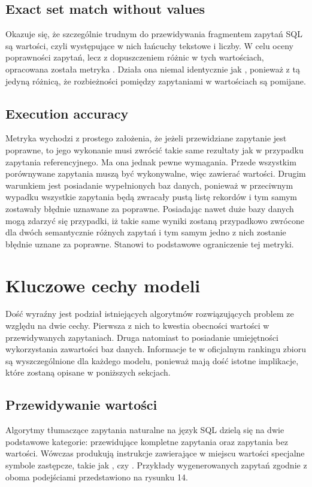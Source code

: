 \subsection{Exact set match without values}
Okazuje się, że szczególnie trudnym do przewidywania fragmentem zapytań SQL są wartości, czyli występujące w nich łańcuchy tekstowe i liczby. W celu oceny poprawności zapytań, lecz z dopuszczeniem różnic w tych wartościach, opracowana została metryka . Działa ona niemal identycznie jak , ponieważ z tą jedyną różnicą, że rozbieżności pomiędzy zapytaniami w wartościach są pomijane.

\subsection{Execution accuracy}
Metryka  wychodzi z prostego założenia, że jeżeli przewidziane zapytanie jest poprawne, to jego wykonanie musi zwrócić takie same rezultaty jak w przypadku zapytania referencyjnego. Ma ona jednak pewne wymagania. Przede wszystkim porównywane zapytania muszą być wykonywalne, więc zawierać wartości. Drugim warunkiem jest posiadanie wypełnionych baz danych, ponieważ w przeciwnym wypadku wszystkie zapytania będą zwracały pustą listę rekordów i tym samym zostawały błędnie uznawane za poprawne. Posiadając nawet duże bazy danych mogą zdarzyć się przypadki, iż takie same wyniki zostaną przypadkowo zwrócone dla dwóch semantycznie różnych zapytań i tym samym jedno z nich zostanie błędnie uznane za poprawne. Stanowi to podstawowe ograniczenie tej metryki.

\section{Kluczowe cechy modeli}
Dość wyraźny jest podział istniejących algorytmów rozwiązujących problem  ze względu na dwie cechy. Pierwsza z nich to kwestia obecności wartości w przewidywanych zapytaniach. Druga natomiast to posiadanie umiejętności wykorzystania zawartości baz danych. Informacje te w oficjalnym rankingu zbioru  są wyszczególnione dla każdego modelu, ponieważ mają dość istotne implikacje, które zostaną opisane w poniższych sekcjach.

\subsection{Przewidywanie wartości}
Algorytmy tłumaczące zapytania naturalne na język SQL dzielą się na dwie podstawowe kategorie: przewidujące kompletne zapytania oraz zapytania bez wartości. Wówczas produkują instrukcje zawierające w miejscu wartości specjalne symbole zastępcze, takie jak , czy . Przykłady wygenerowanych zapytań zgodnie z oboma podejściami przedstawiono na rysunku 14.

